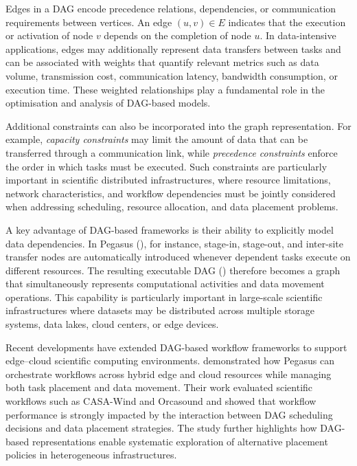 \documentclass[a4paper,fleqn]{cas-dc}
\begin{document}
Edges in a DAG encode precedence relations, dependencies, or communication requirements between vertices. An edge \((u,v) \in E\) indicates that the execution or activation of node \(v\) depends on the completion of node \(u\). In data-intensive applications, edges may additionally represent data transfers between tasks and can be associated with weights that quantify relevant metrics such as data volume, transmission cost, communication latency, bandwidth consumption, or execution time. These weighted relationships play a fundamental role in the optimisation and analysis of DAG-based models.

Additional constraints can also be incorporated into the graph representation. For example, \emph{capacity constraints} may limit the amount of data that can be transferred through a communication link, while \emph{precedence constraints} enforce the order in which tasks must be executed. Such constraints are particularly important in scientific distributed infrastructures, where resource limitations, network characteristics, and workflow dependencies must be jointly considered when addressing scheduling, resource allocation, and data placement problems.

A key advantage of DAG-based frameworks is their ability to explicitly model data dependencies. In Pegasus (\citealp{PegasusDocumentation}), for instance, stage-in, stage-out, and inter-site transfer nodes are automatically introduced whenever dependent tasks execute on different resources. The resulting executable DAG (\citealp{PegasusRunningWorkflows}) therefore becomes a graph that simultaneously represents computational activities and data movement operations. This capability is particularly important in large-scale scientific infrastructures where datasets may be distributed across multiple storage systems, data lakes, cloud centers, or edge devices.

Recent developments have extended DAG-based workflow frameworks to support edge–cloud scientific computing environments. \citealt{9825937} demonstrated how Pegasus can orchestrate workflows across hybrid edge and cloud resources while managing both task placement and data movement. Their work evaluated scientific workflows such as CASA-Wind and Orcasound and showed that workflow performance is strongly impacted by the interaction between DAG scheduling decisions and data placement strategies. The study further highlights how DAG-based representations enable systematic exploration of alternative placement policies in heterogeneous infrastructures.
\end{document}

